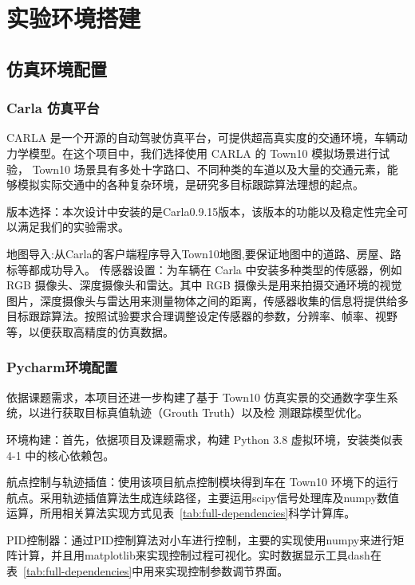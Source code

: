 \chapter{实验环境搭建}

\section{仿真环境配置}

\subsection{Carla 仿真平台}


CARLA 是一个开源的自动驾驶仿真平台，可提供超高真实度的交通环境，车辆动力学模型。在这个项目中，我们选择使用 CARLA 的 Town10 模拟场景进行试验， Town10 场景具有多处十字路口、不同种类的车道以及大量的交通元素，能够模拟实际交通中的各种复杂环境，是研究多目标跟踪算法理想的起点。

版本选择：本次设计中安装的是Carla0.9.15版本，该版本的功能以及稳定性完全可以满足我们的实验需求。

地图导入:从Carla的客户端程序导入Town10地图,要保证地图中的道路、房屋、路标等都成功导入。
传感器设置：为车辆在 Carla 中安装多种类型的传感器，例如 RGB 摄像头、深度摄像头和雷达。其中 RGB 摄像头是用来拍摄交通环境的视觉图片，深度摄像头与雷达用来测量物体之间的距离，传感器收集的信息将提供给多目标跟踪算法。按照试验要求合理调整设定传感器的参数，分辨率、帧率、视野等，以便获取高精度的仿真数据。



\subsection{Pycharm环境配置}

依据课题需求，本项目还进一步构建了基于 Town10 仿真实景的交通数字孪生系统，以进行获取目标真值轨迹（Grouth Truth）以及检 测跟踪模型优化。

环境构建：首先，依据项目及课题需求，构建 Python 3.8 虚拟环境，安装类似表 4-1 中的核心依赖包。

航点控制与轨迹插值：使用该项目航点控制模块得到车在 Town10 环境下的运行航点。采用轨迹插值算法生成连续路径，主要运用scipy信号处理库及numpy数值运算，所用相关算法实现方式见表~\ref{tab:full-dependencies}科学计算库。

PID控制器：通过PID控制算法对小车进行控制，主要的实现使用numpy来进行矩阵计算，并且用matplotlib来实现控制过程可视化。实时数据显示工具dash在表~\ref{tab:full-dependencies}中用来实现控制参数调节界面。


